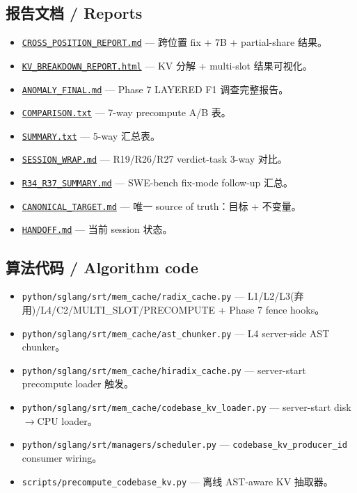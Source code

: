 \documentclass[11pt,a4paper]{article}
\begin{document}
\subsection*{报告文档 / Reports}
\begin{itemize}
  \item \href{file:../results/kvcomm_ab/CROSS_POSITION_REPORT.md}{\texttt{CROSS\_POSITION\_REPORT.md}} --- 跨位置 fix + 7B + partial-share 结果。
  \item \href{file:../results/kvcomm_ab/KV_BREAKDOWN_REPORT.html}{\texttt{KV\_BREAKDOWN\_REPORT.html}} --- KV 分解 + multi-slot 结果可视化。
  \item \href{file:../results/kvcomm_ab/precompute_ab_report/ANOMALY_FINAL.md}{\texttt{ANOMALY\_FINAL.md}} --- Phase 7 LAYERED F1 调查完整报告。
  \item \href{file:../results/kvcomm_ab/precompute_ab_report/COMPARISON.txt}{\texttt{COMPARISON.txt}} --- 7-way precompute A/B 表。
  \item \href{file:../results/kvcomm_ab/precompute_ab_report/SUMMARY.txt}{\texttt{SUMMARY.txt}} --- 5-way 汇总表。
  \item \href{file:../results/SESSION_WRAP.md}{\texttt{SESSION\_WRAP.md}} --- R19/R26/R27 verdict-task 3-way 对比。
  \item \href{file:../results/R34_R37_SUMMARY.md}{\texttt{R34\_R37\_SUMMARY.md}} --- SWE-bench fix-mode follow-up 汇总。
  \item \href{file:../CANONICAL_TARGET.md}{\texttt{CANONICAL\_TARGET.md}} --- 唯一 source of truth：目标 + 不变量。
  \item \href{file:../HANDOFF.md}{\texttt{HANDOFF.md}} --- 当前 session 状态。
\end{itemize}

\subsection*{算法代码 / Algorithm code}
\begin{itemize}
  \item \texttt{python/sglang/srt/mem\_cache/radix\_cache.py} --- L1/L2/L3(弃用)/L4/C2/MULTI\_SLOT/PRECOMPUTE + Phase 7 fence hooks。
  \item \texttt{python/sglang/srt/mem\_cache/ast\_chunker.py} --- L4 server-side AST chunker。
  \item \texttt{python/sglang/srt/mem\_cache/hiradix\_cache.py} --- server-start precompute loader 触发。
  \item \texttt{python/sglang/srt/mem\_cache/codebase\_kv\_loader.py} --- server-start disk$\to$CPU loader。
  \item \texttt{python/sglang/srt/managers/scheduler.py} --- \texttt{codebase\_kv\_producer\_id} consumer wiring。
  \item \texttt{scripts/precompute\_codebase\_kv.py} --- 离线 AST-aware KV 抽取器。
\end{itemize}
\end{document}
